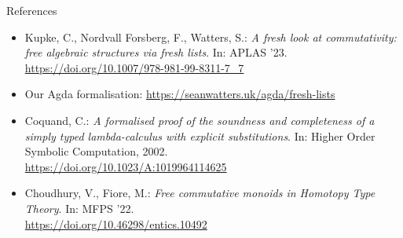 \documentclass{beamer}
\begin{document}
\begin{frame}{References}
\begin{itemize}
  \item Kupke, C., Nordvall Forsberg, F., Watters, S.: \emph{A fresh look at commutativity: free algebraic structures via fresh lists}. In: APLAS '23. \\
        \url{https://doi.org/10.1007/978-981-99-8311-7_7}
  \item Our Agda formalisation: \url{https://seanwatters.uk/agda/fresh-lists}
  \item Coquand, C.: \emph{A formalised proof of the soundness and completeness of a simply
        typed lambda-calculus with explicit substitutions}. In: Higher Order Symbolic Computation, 2002. \\
        \url{https://doi.org/10.1023/A:1019964114625}
  \item Choudhury, V., Fiore, M.: \emph{Free commutative monoids in Homotopy Type Theory}. In: MFPS '22. \\
        \url{https://doi.org/10.46298/entics.10492}
\end{itemize}
\end{frame}
\end{document}
